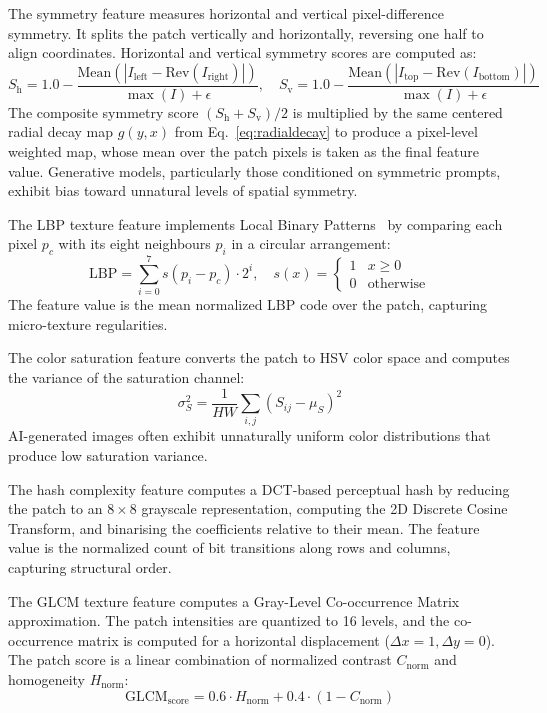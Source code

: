 \documentclass[runningheads]{llncs}
\begin{document}
The symmetry feature measures horizontal and vertical pixel-difference symmetry. It splits the patch vertically and horizontally, reversing one half to align coordinates. Horizontal and vertical symmetry scores are computed as:
\begin{equation}
S_{\text{h}} = 1.0 - \frac{\text{Mean}(|I_{\text{left}} - \text{Rev}(I_{\text{right}})|)}{\max(I) + \epsilon}, \quad S_{\text{v}} = 1.0 - \frac{\text{Mean}(|I_{\text{top}} - \text{Rev}(I_{\text{bottom}})|)}{\max(I) + \epsilon}
\end{equation}
The composite symmetry score $(S_{\text{h}} + S_{\text{v}}) / 2$ is multiplied by the same centered radial decay map $g(y,x)$ from Eq.~\ref{eq:radialdecay} to produce a pixel-level weighted map, whose mean over the patch pixels is taken as the final feature value. Generative models, particularly those conditioned on symmetric prompts, exhibit bias toward unnatural levels of spatial symmetry.

The LBP texture feature implements Local Binary Patterns~\cite{ojala2002multiresolution} by comparing each pixel $p_c$ with its eight neighbours $p_i$ in a circular arrangement:
\begin{equation}
\text{LBP} = \sum_{i=0}^{7} s(p_i - p_c) \cdot 2^i, \quad s(x) = \begin{cases} 1 & x \geq 0 \\ 0 & \text{otherwise} \end{cases}
\end{equation}
The feature value is the mean normalized LBP code over the patch, capturing micro-texture regularities.

The color saturation feature converts the patch to HSV color space and computes the variance of the saturation channel:
\begin{equation}
\sigma_S^2 = \frac{1}{HW} \sum_{i,j} (S_{ij} - \mu_S)^2
\end{equation}
AI-generated images often exhibit unnaturally uniform color distributions that produce low saturation variance.

The hash complexity feature computes a DCT-based perceptual hash by reducing the patch to an $8 \times 8$ grayscale representation, computing the 2D Discrete Cosine Transform, and binarising the coefficients relative to their mean. The feature value is the normalized count of bit transitions along rows and columns, capturing structural order.

The GLCM texture feature computes a Gray-Level Co-occurrence Matrix~\cite{haralick1973textural} approximation. The patch intensities are quantized to 16 levels, and the co-occurrence matrix is computed for a horizontal displacement ($\Delta x = 1, \Delta y = 0$). The patch score is a linear combination of normalized contrast $C_{\text{norm}}$ and homogeneity $H_{\text{norm}}$:
\begin{equation}
\text{GLCM}_{\text{score}} = 0.6 \cdot H_{\text{norm}} + 0.4 \cdot (1 - C_{\text{norm}})
\end{equation}
\end{document}
